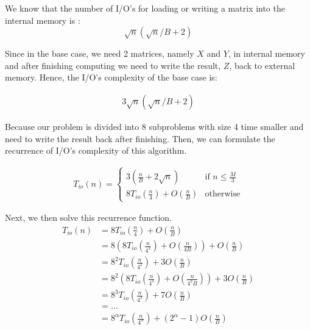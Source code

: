 We know that the number of I/O's for loading or writing a matrix into the internal memory is :
$$\sqrt{n}(\sqrt{n}/B+2)$$

Since in the base case, we need 2 matrices, namely $X$ and $Y$, in internal memory and after finishing computing
we need to write the result, $Z$, back to external memory. Hence, the I/O's complexity of the base case is:

\begin{align*}
    3\sqrt{n}(\sqrt{n}/B + 2)
\end{align*}

Because our problem is divided into $8$ subproblems with size 4 time smaller and need to write the result back after finishing.
Then, we can formulate the recurrence of I/O's complexity of this algorithm.

\begin{align*}
    T_{io}(n) = \begin{cases}
	    3( \frac{n}{B} + 2\sqrt{n} ) & \text{if } n \leq \frac{M}{3}\\
        8T_{io}(\frac{n}{4}) + O(\frac{n}{B})              & \text{otherwise}
	\end{cases}
\end{align*}

Next, we then solve this recurrence function.
\begin{align*}
    T_{io}(n) &= 8T_{io}(\frac{n}{4}) + O(\frac{n}{B}) \\
              &= 8( 8T_{io}(\frac{n}{4^2}) + O(\frac{n}{4B}) ) + O(\frac{n}{B}) \\
              &= 8^2T_{io}(\frac{n}{4^2}) + 3O(\frac{n}{B}) \\
              &= 8^2( 8T_{io}(\frac{n}{4^3}) + O(\frac{n}{4^2B}) ) + 3O(\frac{n}{B}) \\
              &= 8^3T_{io}(\frac{n}{4^3}) + 7O(\frac{n}{B}) \\
&= ... \\
&= 8^{\alpha}T_{io}(\frac{n}{4^\alpha}) + ( 2^\alpha - 1 )O(\frac{n}{B})
\end{align*}


